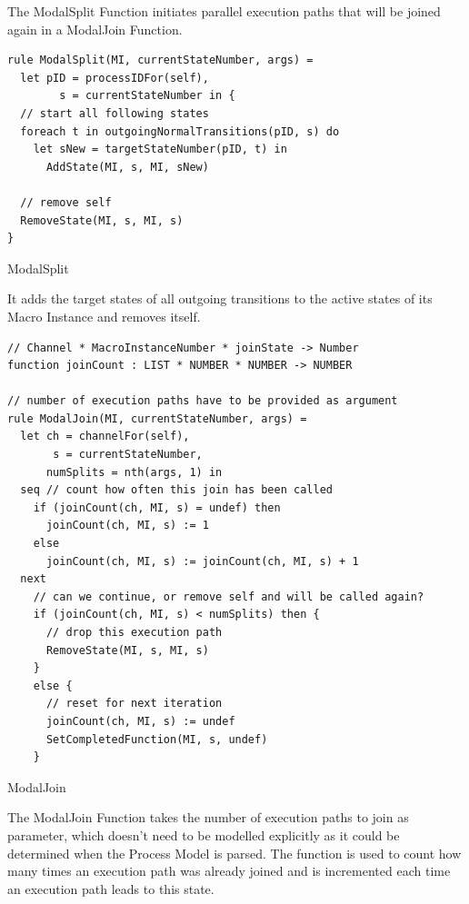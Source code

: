The ModalSplit Function initiates parallel execution paths that will be joined
again in a ModalJoin Function.


\begin{listing}[htbp]
\begin{verbatim}
rule ModalSplit(MI, currentStateNumber, args) =
  let pID = processIDFor(self),
        s = currentStateNumber in {
  // start all following states
  foreach t in outgoingNormalTransitions(pID, s) do
    let sNew = targetStateNumber(pID, t) in
      AddState(MI, s, MI, sNew)

  // remove self
  RemoveState(MI, s, MI, s)
}
\end{verbatim}
\caption{ModalSplit}
\label{lst:shortasm:ModalSplit}
\end{listing}


It adds the target states of all outgoing transitions to the active states of its
Macro Instance and removes itself.



\begin{listing}[htbp]
\begin{verbatim}
// Channel * MacroInstanceNumber * joinState -> Number
function joinCount : LIST * NUMBER * NUMBER -> NUMBER

// number of execution paths have to be provided as argument
rule ModalJoin(MI, currentStateNumber, args) =
  let ch = channelFor(self),
       s = currentStateNumber,
      numSplits = nth(args, 1) in
  seq // count how often this join has been called
    if (joinCount(ch, MI, s) = undef) then
      joinCount(ch, MI, s) := 1
    else
      joinCount(ch, MI, s) := joinCount(ch, MI, s) + 1
  next
    // can we continue, or remove self and will be called again?
    if (joinCount(ch, MI, s) < numSplits) then {
      // drop this execution path
      RemoveState(MI, s, MI, s)
    }
    else {
      // reset for next iteration
      joinCount(ch, MI, s) := undef
      SetCompletedFunction(MI, s, undef)
    }
\end{verbatim}
\caption{ModalJoin}
\label{lst:shortasm:ModalJoin}
\end{listing}


The ModalJoin Function takes the number of execution paths to join as parameter,
which doesn't need to be modelled explicitly as it could be determined when the Process Model is parsed.
The  function is used to count how
many times an execution path was already joined and is incremented each time an
execution path leads to this state.

